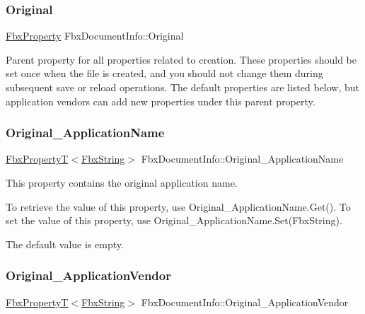 \mbox{\label{class_fbx_document_info_acb08111b968a17d25bdb2e01391500b8}} 
\subsubsection{\texorpdfstring{Original}{Original}}
{\footnotesize\ttfamily \hyperlink{class_fbx_property}{Fbx\+Property} Fbx\+Document\+Info\+::\+Original}

Parent property for all properties related to creation. These properties should be set once when the file is created, and you should not change them during subsequent save or reload operations. The default properties are listed below, but application vendors can add new properties under this parent property. \mbox{\label{class_fbx_document_info_abcddf84735f7ceac288ed1990c837f25}} 
\subsubsection{\texorpdfstring{Original\+\_\+\+Application\+Name}{Original\_ApplicationName}}
{\footnotesize\ttfamily \hyperlink{class_fbx_property_t}{Fbx\+PropertyT}$<$\hyperlink{class_fbx_string}{Fbx\+String}$>$ Fbx\+Document\+Info\+::\+Original\+\_\+\+Application\+Name}

This property contains the original application name.

To retrieve the value of this property, use Original\+\_\+\+Application\+Name.\+Get(). To set the value of this property, use Original\+\_\+\+Application\+Name.\+Set(\+Fbx\+String).

The default value is empty. \mbox{\label{class_fbx_document_info_afe6f02a61f882355521e6f1e45de0a9e}} 
\subsubsection{\texorpdfstring{Original\+\_\+\+Application\+Vendor}{Original\_ApplicationVendor}}
{\footnotesize\ttfamily \hyperlink{class_fbx_property_t}{Fbx\+PropertyT}$<$\hyperlink{class_fbx_string}{Fbx\+String}$>$ Fbx\+Document\+Info\+::\+Original\+\_\+\+Application\+Vendor}

